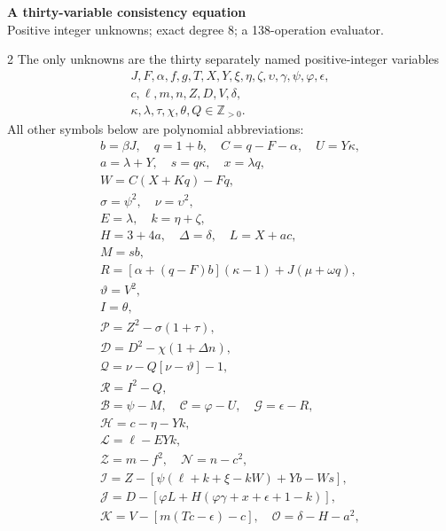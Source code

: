 \documentclass[10pt]{article}
\begin{document}
\begin{center}
{\large\bfseries A thirty-variable consistency equation}\\[-1pt]
{\small Positive integer unknowns; exact degree 8; a 138-operation evaluator.}
\end{center}\vspace{-8pt}
\begin{multicols}{2}
\fontsize{8.6}{9.1}\selectfont
The only unknowns are the thirty separately named positive-integer variables
\[
\begin{gathered}J,F,\alpha,f,g,T,X,Y,\xi,\eta,\zeta,\upsilon,\gamma,\psi,\varphi,\epsilon,\\
c,\ell,m,n,Z,D,V,\delta,\\
\kappa,\lambda,\tau,\chi,\theta,Q\in\mathbb Z_{>0}.\end{gathered}
\]
All other symbols below are polynomial abbreviations:
\[
\begin{gathered}
b=\beta J,\quad q=1+b,\quad C=q-F-\alpha,\quad U=Y\kappa,\\
a=\lambda+Y,\quad s=q\kappa,\quad x=\lambda q,\\
W=C(X+Kq)-Fq,\\
\sigma=\psi^2,\quad\nu=\upsilon^2,\\
E=\lambda,\quad k=\eta+\zeta,\\
H=3+4a,\quad\Delta=\delta,\quad L=X+ac,\\
M=sb,\\
R=[\alpha+(q-F)b](\kappa-1)+J(\mu+\omega q),\\
\vartheta=V^2,\\
I=\theta,\\
\mathcal{P}=Z^2-\sigma(1+\tau),\\
\mathcal{D}=D^2-\chi(1+\Delta n),\\
\mathcal{Q}=\nu-Q[\nu-\vartheta]-1,\\
\mathcal{R}=I^2-Q,\\
\mathcal{B}=\psi-M,\quad \mathcal{C}=\varphi-U,\quad \mathcal{G}=\epsilon-R,\\
\mathcal{H}=c-\eta-Yk,\\
\mathcal{L}=\ell-EYk,\\
\mathcal{Z}=m-f^2,\quad \mathcal{N}=n-c^2,\\
\mathcal{I}=Z-[\psi(\ell+k+\xi-kW)+Yb-Ws],\\
\mathcal{J}=D-[\varphi L+H(\varphi\gamma+x+\epsilon+1-k)],\\
\mathcal{K}=V-[m(Tc-\epsilon)-c],\quad\mathcal{O}=\delta-H-a^2,\\

\end{gathered}\]
\end{multicols}
\end{document}
